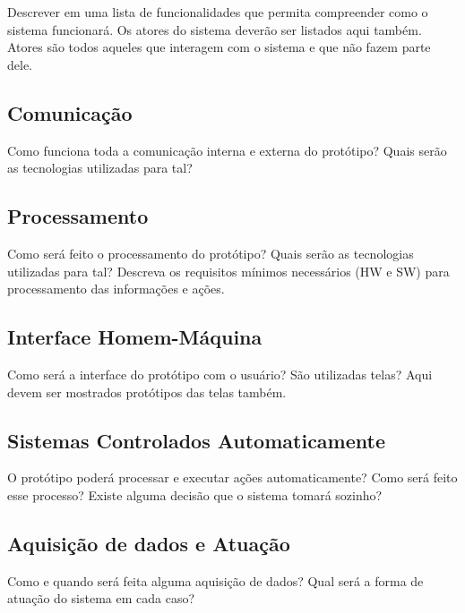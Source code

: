 Descrever em uma lista de funcionalidades que permita compreender como o sistema funcionará. Os atores do sistema deverão ser listados aqui também. Atores são todos aqueles que interagem com o sistema e que não fazem parte dele.

\subsection{Comunicação}
Como funciona toda a comunicação interna e externa do protótipo? Quais serão as tecnologias utilizadas para tal?

\subsection{Processamento}

Como será feito o processamento do protótipo? Quais serão as tecnologias utilizadas para tal? Descreva os requisitos mínimos necessários (HW e SW) para processamento das informações e ações.

\subsection{Interface Homem-Máquina}

Como será a interface do protótipo com o usuário? São utilizadas telas? Aqui devem ser mostrados protótipos das telas também.

\subsection{Sistemas Controlados Automaticamente}

O protótipo poderá processar e executar ações automaticamente? Como será feito esse processo? Existe alguma decisão que o sistema tomará sozinho?

\subsection{Aquisição de dados e Atuação}

Como e quando será feita alguma aquisição de dados? Qual será a forma de atuação do sistema em cada caso?
